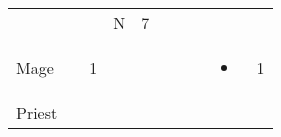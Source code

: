 \documentclass[12pt]{article}
\begin{document}
\begin{longtable}[]{@{}llllllllll@{}}
\begin{minipage}[t]{0.06\columnwidth}
\strut\end{minipage} &
\begin{minipage}[t]{0.06\columnwidth}\raggedright\strut
\strut\end{minipage} &
\begin{minipage}[t]{0.06\columnwidth}\raggedright\strut
\strut\end{minipage} &
\begin{minipage}[t]{0.07\columnwidth}\raggedright\strut
N
\strut\end{minipage} &
\begin{minipage}[t]{0.08\columnwidth}\raggedright\strut
7
\strut\end{minipage}\tabularnewline
\begin{minipage}[t]{0.13\columnwidth}\raggedright\strut
Mage
\strut\end{minipage} &
\begin{minipage}[t]{0.06\columnwidth}\raggedright\strut
\strut\end{minipage} &
\begin{minipage}[t]{0.06\columnwidth}\raggedright\strut
1
\strut\end{minipage} &
\begin{minipage}[t]{0.06\columnwidth}\raggedright\strut
\strut\end{minipage} &
\begin{minipage}[t]{0.06\columnwidth}\raggedright\strut
\strut\end{minipage} &
\begin{minipage}[t]{0.06\columnwidth}\raggedright\strut
\strut\end{minipage} &
\begin{minipage}[t]{0.06\columnwidth}\raggedright\strut
\strut\end{minipage} &
\begin{minipage}[t]{0.06\columnwidth}\raggedright\strut
\strut\end{minipage} &
\begin{minipage}[t]{0.07\columnwidth}\raggedright\strut
\begin{itemize}
\item
\end{itemize}
\strut\end{minipage} &
\begin{minipage}[t]{0.08\columnwidth}\raggedright\strut
1
\strut\end{minipage}\tabularnewline
\begin{minipage}[t]{0.13\columnwidth}\raggedright\strut
Priest
\strut\end{minipage} &

\end{longtable}
\end{document}
